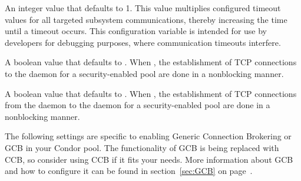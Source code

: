 \begin{description}
\label{param:SubsysTimeoutMultiplier}
\item[\MacroB{<SUBSYS>\_TIMEOUT\_MULTIPLIER}]
  An integer value that defaults to 1.
  This value multiplies configured timeout values
  for all targeted subsystem communications,
  thereby increasing the time until a timeout occurs.
  This configuration variable is intended for use by developers for
  debugging purposes, where communication timeouts interfere.

\label{param:NonblockingCollectorUpdate}
\item[\Macro{NONBLOCKING\_COLLECTOR\_UPDATE}]
  A boolean value that defaults to .
  When , the establishment of TCP connections
  to the  daemon
  for a security-enabled pool are done in a nonblocking manner.

\label{param:NegotiatorUseNonblockingStartdContact}
\item[\Macro{NEGOTIATOR\_USE\_NONBLOCKING\_STARTD\_CONTACT}]
  A boolean value that defaults to .
  When , the establishment of TCP connections
  from the  daemon to the  daemon
  for a security-enabled pool are done in a nonblocking manner.

\end{description}

The following settings are specific to enabling Generic Connection
Brokering or GCB in your Condor pool.  The functionality of GCB is
being replaced with CCB, so consider using CCB if it fits your needs.
More information about GCB and how to configure it can be found in
section~\ref{sec:GCB} on page~\pageref{sec:GCB}.

